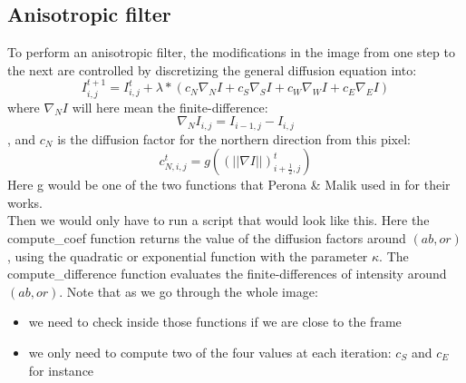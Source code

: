 \documentclass[12pt,a4paper]{book}
\begin{document}
\subsection{Anisotropic filter}

To perform an anisotropic filter, the modifications in the image from one step to the next are controlled by discretizing the general diffusion equation into:
\begin{equation}
I_{i,j}^{t+1} = I_{i,j}^{t} + \lambda * (c_{N} \nabla_{N}I + c_{S} \nabla_{S}I + c_{W} \nabla_{W}I + c_{E} \nabla_{E}I)
\end{equation}
where $\nabla_{N}I$ will here mean the finite-difference:
\begin{equation}
\nabla_{N}I_{i,j} = I_{i-1,j} - I_{i,j}
\end{equation} , and $c_{N}$ is the diffusion factor for the northern direction from this pixel: 
\begin{equation}
c_{N,i,j}^{t} = g((||\nabla I||)_{i+\frac{1}{2},j}^{t})
\end{equation}
Here g would be one of the two functions that Perona \& Malik used in for their works.
\\
Then we would only have to run a script that would look like this.
Here the compute\_coef function returns the value of the diffusion factors around $(ab,or)$, using the quadratic or exponential function with the parameter $\kappa$.
The compute\_difference function evaluates the finite-differences of intensity around $(ab,or)$.
Note that as we go through the whole image:
\begin{itemize}
	\item we need to check inside those functions if we are close to the frame
	\item we only need to compute two of the four values at each iteration: $c_{S}$ and $c_{E}$ for instance
\end{itemize}
\end{document}
